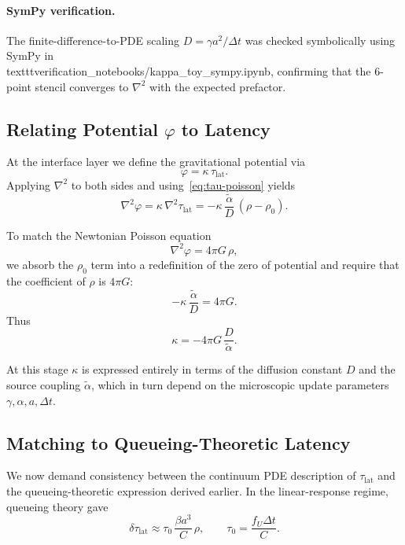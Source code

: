 \paragraph{SymPy verification.}
The finite-difference-to-PDE scaling $D = \gamma a^2 / \Delta t$ was checked
symbolically using SymPy in
\\texttt{verification\_notebooks/kappa\_toy\_sympy.ipynb}, confirming that the
6-point stencil converges to $\nabla^2$ with the expected prefactor.

\subsection{Relating Potential $\varphi$ to Latency}
At the interface layer we define the gravitational potential via
\begin{equation}
\varphi = \kappa \, \tau_{\mathrm{lat}}.
\end{equation}
Applying $\nabla^2$ to both sides and using~\eqref{eq:tau-poisson} yields
\begin{equation}
\nabla^2 \varphi = \kappa \, \nabla^2 \tau_{\mathrm{lat}}
  = -\kappa \, \frac{\tilde{\alpha}}{D} \, (\rho - \rho_0).
\end{equation}

To match the Newtonian Poisson equation
\begin{equation}
\nabla^2 \varphi = 4\pi G \, \rho,
\end{equation}
we absorb the $\rho_0$ term into a redefinition of the zero of potential and
require that the coefficient of $\rho$ is $4\pi G$:
\begin{equation}
-\kappa \, \frac{\tilde{\alpha}}{D} = 4\pi G.
\end{equation}
Thus
\begin{equation}
\kappa = -4\pi G \, \frac{D}{\tilde{\alpha}}.
\label{eq:kappa-D-alpha}
\end{equation}

At this stage $\kappa$ is expressed entirely in terms of the diffusion
constant $D$ and the source coupling $\tilde{\alpha}$, which in turn depend
on the microscopic update parameters $\gamma, \alpha, a, \Delta t$.

\subsection{Matching to Queueing-Theoretic Latency}
We now demand consistency between the continuum PDE description of
$\tau_{\mathrm{lat}}$ and the queueing-theoretic expression derived earlier.
In the linear-response regime, queueing theory gave
\begin{equation}
\delta \tau_{\mathrm{lat}} \approx \tau_0 \, \frac{\beta a^3}{C} \, \rho,
\qquad \tau_0 = \frac{f_U \Delta t}{C}.
\label{eq:queue-linear}
\end{equation}

